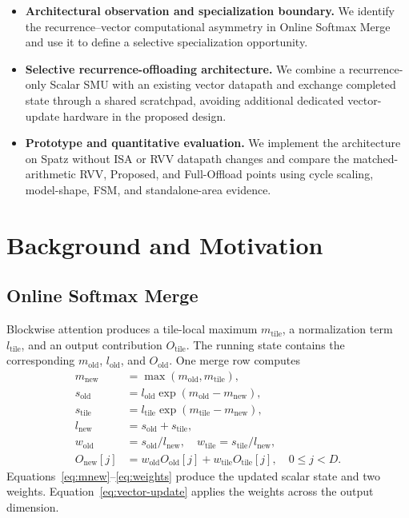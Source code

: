 \documentclass[journal]{IEEEtran}
\begin{document}
\begin{itemize}
  \item \textbf{Architectural observation and specialization boundary.} We
  identify the recurrence--vector computational asymmetry in Online Softmax
  Merge and use it to define a selective specialization opportunity.

  \item \textbf{Selective recurrence-offloading architecture.} We combine a
  recurrence-only Scalar SMU with an existing vector datapath and exchange
  completed state through a shared scratchpad, avoiding additional dedicated
  vector-update hardware in the proposed design.

  \item \textbf{Prototype and quantitative evaluation.} We implement the
  architecture on Spatz without ISA or RVV datapath changes and compare the
  matched-arithmetic RVV, Proposed, and Full-Offload points using cycle
  scaling, model-shape, FSM, and standalone-area evidence.
\end{itemize}

\section{Background and Motivation}

\subsection{Online Softmax Merge}

Blockwise attention produces a tile-local maximum $m_{\mathrm{tile}}$, a
normalization term $l_{\mathrm{tile}}$, and an output contribution
$O_{\mathrm{tile}}$. The running state contains the corresponding
$m_{\mathrm{old}}$, $l_{\mathrm{old}}$, and $O_{\mathrm{old}}$. One merge row
computes
\begin{align}
m_{\mathrm{new}} &= \max(m_{\mathrm{old}},m_{\mathrm{tile}}),\label{eq:mnew}\\
s_{\mathrm{old}} &= l_{\mathrm{old}}
  \exp(m_{\mathrm{old}}-m_{\mathrm{new}}),\label{eq:sold}\\
s_{\mathrm{tile}} &= l_{\mathrm{tile}}
  \exp(m_{\mathrm{tile}}-m_{\mathrm{new}}),\label{eq:stile}\\
l_{\mathrm{new}} &= s_{\mathrm{old}}+s_{\mathrm{tile}},\label{eq:lnew}\\
w_{\mathrm{old}} &= s_{\mathrm{old}}/l_{\mathrm{new}},\quad
w_{\mathrm{tile}} = s_{\mathrm{tile}}/l_{\mathrm{new}},\label{eq:weights}\\
O_{\mathrm{new}}[j] &= w_{\mathrm{old}}O_{\mathrm{old}}[j]
  +w_{\mathrm{tile}}O_{\mathrm{tile}}[j],\quad 0\leq j<D.
  \label{eq:vector-update}
\end{align}
Equations~\eqref{eq:mnew}--\eqref{eq:weights} produce the updated scalar state
and two weights. Equation~\eqref{eq:vector-update} applies the weights across
the output dimension.
\end{document}
